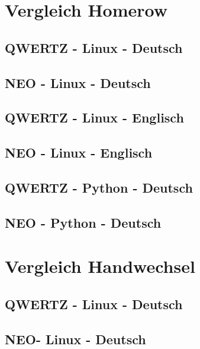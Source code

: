\documentclass{beamer}
\begin{document}
\section{Vergleich Homerow}

\subsection{QWERTZ - Linux - Deutsch}
\frame{ 
  
}
\subsection{NEO - Linux - Deutsch}
\frame{
  
}

\subsection{QWERTZ - Linux - Englisch}
\frame{ 
   
} 

\subsection{NEO - Linux - Englisch}
\frame{
  
}

\subsection{QWERTZ - Python - Deutsch}
\frame{
  
}

\subsection{NEO - Python - Deutsch}
\frame{
  
}

\section{Vergleich Handwechsel}
\subsection{QWERTZ - Linux - Deutsch}
\frame{
  
}
\subsection{NEO- Linux - Deutsch}
\frame{
  
}
\end{document}
